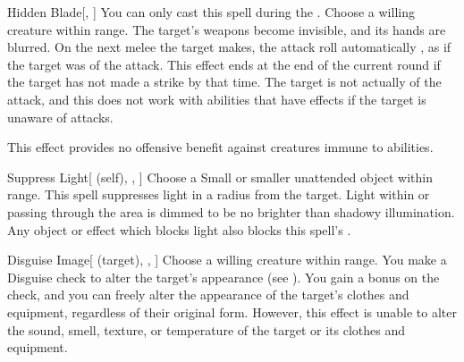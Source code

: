 \lowercase{\hypertarget{spell:Hidden Blade}{}}\label{spell:Hidden Blade}
\begin{freeability}[\nth{1}]{\hypertarget{spell:Hidden Blade}{Hidden Blade}}[, ]
You can only cast this spell during the .
Choose a willing creature within \rngclose range.
The target's weapons become invisible, and its hands are blurred.
On the next melee  the target makes,
the attack roll automatically ,
as if the target was  of the attack.
This effect ends at the end of the current round if the target has not made a strike by that time.
The target is not actually  of the attack, and this does not work with abilities that have effects if the target is unaware of attacks.

This effect provides no offensive benefit against creatures immune to  abilities.
\end{freeability}
\vspace{0.25em}



\lowercase{\hypertarget{spell:Suppress Light}{}}\label{spell:Suppress Light}
\begin{attuneability}[\nth{1}]{\hypertarget{spell:Suppress Light}{Suppress Light}}[ (self), , ]
Choose a Small or smaller unattended object within \rngclose range.
This spell suppresses light in a \areamed radius  from the target.
Light within or passing through the area is dimmed to be no brighter than shadowy illumination.
Any object or effect which blocks light also blocks this spell's .
\end{attuneability}
\vspace{0.25em}



\lowercase{\hypertarget{spell:Disguise Image}{}}\label{spell:Disguise Image}
\begin{attuneability}[\nth{2}]{\hypertarget{spell:Disguise Image}{Disguise Image}}[ (target), , ]
Choose a willing creature within \rngclose range.
You make a Disguise check to alter the target's appearance (see ).
You gain a  bonus on the check, and you can freely alter the appearance of the target's clothes and equipment, regardless of their original form.
However, this effect is unable to alter the sound, smell, texture, or temperature of the target or its clothes and equipment.
\end{attuneability}
\vspace{0.25em}



